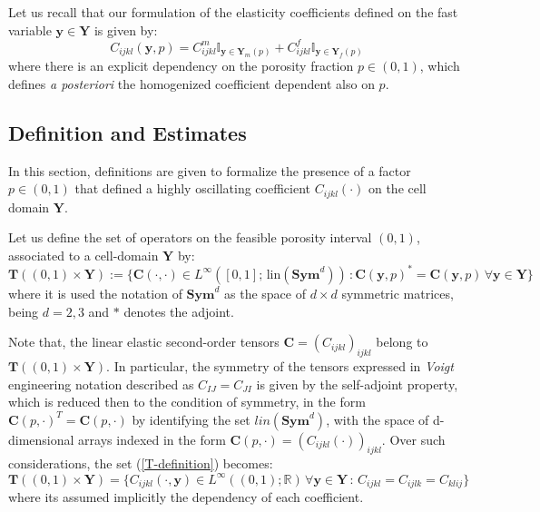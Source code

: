 Let us recall that our formulation of the elasticity coefficients defined on the fast variable $\mathbf{y} \in \mathbf{Y}$ is given by:
\begin{equation*}
    C_{ijkl}(\mathbf{y}, p) = C_{ijkl}^{m} \mathbb{I}_{\mathbf{y} \in \mathbf{Y}_m(p)} + C_{ijkl}^{f} \mathbb{I}_{\mathbf{y} \in \mathbf{Y}_f(p)}
\end{equation*}
where there is an explicit dependency on the porosity fraction $p \in (0,1)$, which defines \textit{a posteriori} the homogenized coefficient dependent also on $p$.

\subsection{Definition and Estimates}
In this section, definitions are given to formalize the presence of a factor $p \in (0,1)$ that defined a highly oscillating coefficient $C_{ijkl}(\cdot)$ on the cell domain $\mathbf{Y}$.
\begin{defn}
Let us define the set of operators on the feasible porosity interval $(0,1)$, associated to a cell-domain $\mathbf{Y}$ by:
\begin{equation}
    \label{T-definition}
    \mathbf{T}((0,1) \times \mathbf{Y}) := \big \{ \mathbf{C}(\cdot, \cdot) \in L^{\infty}([0,1]; \, \text{lin}(\textbf{Sym}^d))\, : \mathbf{C}(\mathbf{y}, p)^* = \mathbf{C}(\mathbf{y}, p) \, \forall \mathbf{y} \in \mathbf{Y}\big \}
\end{equation}
where it is used the notation of $\mathbf{Sym}^d$ as the space of $d\times d$ symmetric matrices, being $d=2,3$ and $*$ denotes the adjoint.
\end{defn}
\begin{rem}
Note that, the linear elastic second-order tensors $\mathbf{C} = (C_{ijkl})_{ijkl}$ belong to $\mathbf{T}((0,1)\times \mathbf{Y})$. In particular, the symmetry of the tensors expressed in \textit{Voigt} engineering notation described as $C_{IJ}=C_{JI}$ is given by the self-adjoint property, which is reduced then to the condition of symmetry, in the form $\mathbf{C}(p, \cdot)^T = \mathbf{C}(p,\cdot)$ by identifying the set $lin(\mathbf{Sym}^d)$, with the space of d-dimensional arrays indexed in the form $\mathbf{C}(p, \cdot) = (C_{ijkl} (\cdot) )_{ijkl}$.
Over such considerations, the set (\ref{T-definition}) becomes:
\begin{equation*}
    \mathbf{T}((0,1)\times \mathbf{Y}) = \big \{ C_{ijkl}(\cdot, \mathbf{y}) \in L^{\infty}((0,1); \mathbb{R}) \, \forall \mathbf{y} \in \mathbf{Y}\,:\, C_{ijkl} = C_{ijlk} = C_{klij} \big \}
\end{equation*}
where its assumed implicitly the dependency of each coefficient.
\end{rem}
